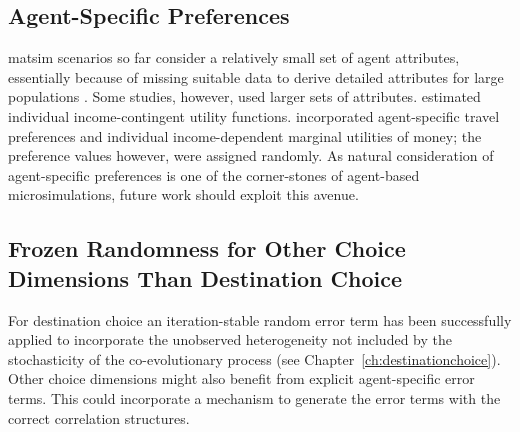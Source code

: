 \subsection{Agent-Specific Preferences}
\label{sec:agent-specific-prefs}
\gls{matsim} scenarios so far consider a relatively small set of agent attributes, essentially because of missing suitable data to derive detailed attributes for large populations \citep[][]{MuellerFloetteroed_unpub_hEART_2014}. 
Some studies, however, used larger sets of attributes. 
\citet{GretherEtAl2010TrbIncomeInTRR, KickhoeferEtAl_Transportation_2011} estimated individual income-contingent utility functions. 
\citet[][]{HorniEtAl_TechRep_IVT_2012_a, HorniAxhausen_TechRep_IVT_2014} incorporated agent-specific travel preferences and individual income-dependent marginal utilities of money; the preference values however, were assigned randomly. 
As natural consideration of agent-specific preferences is one of the corner-stones of agent-based \glspl{microsimulation}, future work should exploit this avenue. 


\subsection{Frozen Randomness for Other Choice Dimensions Than Destination Choice}
\label{sec:future-frozen-randomness}

For destination choice an iteration-stable random error term has been successfully applied to incorporate the unobserved heterogeneity not included by the stochasticity of the co-evolutionary process (see Chapter~\ref{ch:destinationchoice}). Other choice dimensions
might also benefit from explicit agent-specific error terms.  
This 
could incorporate a mechanism to generate the error terms with the correct correlation structures. 


